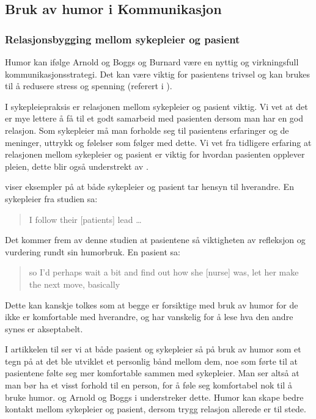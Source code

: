 \subsection{Bruk av humor i Kommunikasjon}

\subsubsection{Relasjonsbygging mellom sykepleier og pasient}
\label{disk.relbygg}

Humor kan ifølge Arnold og Boggs og Burnard være en nyttig og virkningsfull
kommunikasjonsstrategi. Det kan være viktig for pasientens trivsel og kan
brukes til å redusere stress og spenning (referert i ).

I sykepleiepraksis er relasjonen mellom sykepleier og pasient viktig. Vi vet at
det er mye lettere å få til et godt samarbeid med pasienten dersom man har en
god relasjon. Som sykepleier må man forholde seg til pasientens erfaringer og
de meninger, uttrykk og følelser som følger med dette. Vi vet fra tidligere
erfaring at relasjonen mellom sykepleier og pasient er viktig for hvordan
pasienten opplever pleien, dette blir også understrekt av .

 viser eksempler på at både sykepleier og pasient tar hensyn
til hverandre. En sykepleier fra studien sa:
\blockquote[{}]{I follow their [patients] lead
\ldots}. Det kommer frem av denne studien at pasientene så viktigheten av
refleksjon og vurdering rundt sin humorbruk. En pasient sa:
\blockquote[{}]{so I'd perhaps wait a bit and find
out how she [nurse] was, let her make the next move, basically}.

Dette kan kanskje tolkes som at begge er forsiktige med bruk av humor for de
ikke er komfortable med hverandre, og har vanskelig for å lese hva den andre
synes er akseptabelt.

I artikkelen til  ser vi at både pasient og sykepleier så på
bruk av humor som et tegn på at det ble utviklet et personlig bånd mellom dem,
noe som førte til at pasientene følte seg mer komfortable sammen med
sykepleier. Man ser altså at man bør ha et visst forhold til en person, for å
føle seg komfortabel nok til å bruke humor.  og Arnold
og Boggs i  understreker dette. Humor kan skape bedre kontakt
mellom sykepleier og pasient, dersom trygg relasjon allerede er til stede.

